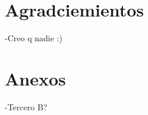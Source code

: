 \documentclass{wscpaperproc}
\theoremstyle{wsc}
\begin{document}




% 
% 




\section*{Agradciemientos}

-Creo q nadie :)

\section{Anexos}
-Tercero B?
\end{document}

